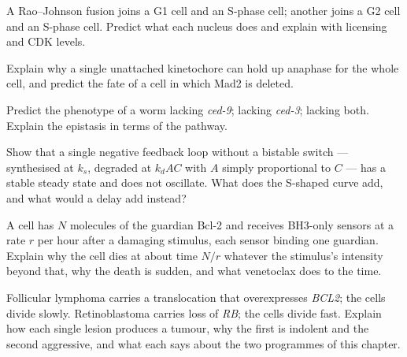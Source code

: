 \begin{exercise}[$\star\star$]\label{exo:b3:cell-cycle-apoptosis:7}
A Rao--Johnson fusion joins a G1 cell and an S-phase cell; another
joins a G2 cell and an S-phase cell. Predict what each nucleus does and
explain with licensing and CDK levels.
\end{exercise}

\begin{exercise}[$\star\star$]\label{exo:b3:cell-cycle-apoptosis:8}
Explain why a single unattached kinetochore can hold up anaphase for
the whole cell, and predict the fate of a cell in which Mad2 is
deleted.
\end{exercise}

\begin{exercise}[$\star\star$]\label{exo:b3:cell-cycle-apoptosis:9}
Predict the phenotype of a worm lacking \emph{ced-9}; lacking
\emph{ced-3}; lacking both. Explain the epistasis in terms of the
pathway.
\end{exercise}

\begin{exercise}[$\star\star\star$]\label{exo:b3:cell-cycle-apoptosis:10}
Show that a single negative feedback loop without a bistable switch
---  synthesised at $k_{s}$, degraded at $k_{d}AC$ with $A$
simply proportional to $C$ --- has a stable steady state and does not
oscillate. What does the S-shaped curve add, and what would a delay
add instead?
\end{exercise}

\begin{exercise}[$\star\star\star$]\label{exo:b3:cell-cycle-apoptosis:11}
A cell has $N$ molecules of the guardian Bcl-2 and receives BH3-only
sensors at a rate $r$ per hour after a damaging stimulus, each sensor
binding one guardian. Explain why the cell dies at about time $N/r$
whatever the stimulus's intensity beyond that, why the death is sudden,
and what venetoclax does to the time.
\end{exercise}

\begin{exercise}[$\star\star\star$]\label{exo:b3:cell-cycle-apoptosis:12}
Follicular lymphoma carries a translocation that overexpresses
\emph{BCL2}; the cells divide slowly. Retinoblastoma carries loss of
\emph{RB}; the cells divide fast. Explain how each single lesion
produces a tumour, why the first is indolent and the second aggressive,
and what each says about the two programmes of this chapter.
\end{exercise}

